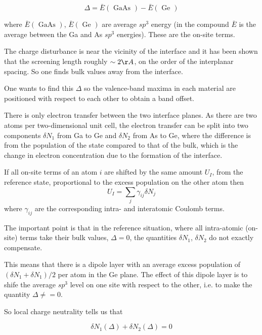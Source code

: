 \documentclass[11pt]{article}
\begin{document}
\begin{enumerate}
\begin{enumerate}
\begin{enumerate}
\[
\Delta = \bar{ E }( \text{ GaAs } ) - \bar{ E }( \text{ Ge } )
\]

where $\bar{ E }( \text{ GaAs } )$, $\bar{ E }( \text{ Ge } )$ are average $sp^3$ energy 
(in the compound $\bar{E}$ is the average between the Ga and As $sp^3$
energies). These are the on-site terms. 

The charge disturbance is near the vicinity of the interface and it has been
shown that the screening length roughly $\sim 2\AA$, on the order of the
interplanar spacing. So one finds bulk values away from the interface. 

One wants to find this $\Delta$ so the valence-band maxima in each material
are positioned with respect to each other to obtain a band offset. 

There is only electron transfer between the two
interface planes. As there are two atoms per two-dimensional unit cell, the
electron transfer can be split into two components $\delta N_1$ from Ga to Ge
and $\delta N_2$ from As to Ge, where the difference is from the population of
the state compared to that of the bulk, which is the change in electron
concentration due to the formation of the interface. 

If all on-site terms of an atom $i$ are shifted by the same
amount $U_{I}$, from the reference state, proportional to the excess
population on the other atom then
\[
U_{I} = \sum_{j} \gamma_{ij} \delta N_{j}
\] 
where $\gamma_{ij}$ are the corresponding intra- and interatomic Coulomb
terms. 

The important point is that in the reference situation, where all intra-atomic (on-site)
terms take their bulk values, $\Delta = 0$, the quantities $\delta N_1$,
$\delta N_2$ do not exactly compensate. 

This means that there is a dipole layer with an average excess population of
$( \delta N_1 + \delta N_1)/2$ per atom in the Ge plane. The effect of this
dipole layer is to shife the average $sp^3$ level on one site with respect to
the other, i.e. to make the quantity $\Delta \neq = 0$. 

So local charge neutrality tells us that 

\[ 
\delta N_1(\Delta) + \delta N_2(\Delta) = 0
\]
\end{enumerate}
\end{enumerate}
\end{enumerate}
\end{document}
